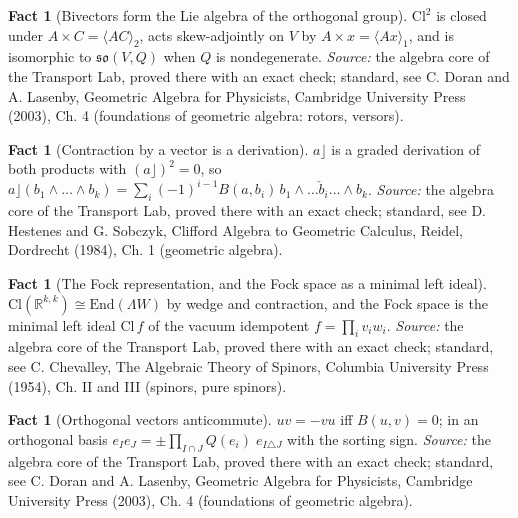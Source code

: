 \documentclass[11pt]{article}
\theoremstyle{definition}
\newtheorem{fact}[theorem]{Fact}
\theoremstyle{plain}
\providecommand{\Cl}{}\renewcommand{\Cl}{\mathrm{Cl}}
\providecommand{\End}{}\renewcommand{\End}{\mathrm{End}}
\providecommand{\R}{}\renewcommand{\R}{\mathbb{R}}
\providecommand{\so}{}\renewcommand{\so}{\mathfrak{so}}
\begin{document}
\begin{fact}[Bivectors form the Lie algebra of the orthogonal group]\label{c:std-algebra.bivector-lie-algebra}
$\Cl^{2}$ is closed under $A \times C = \langle AC \rangle_2$, acts skew-adjointly on $V$ by $A \times x = \langle Ax \rangle_1$, and is isomorphic to $\so(V,Q)$ when $Q$ is nondegenerate.
\emph{Source:} the algebra core of the Transport Lab, proved there with an exact check; standard, see C. Doran and A. Lasenby, Geometric Algebra for Physicists, Cambridge University Press (2003), Ch. 4 (foundations of geometric algebra: rotors, versors).
\end{fact}

\begin{fact}[Contraction by a vector is a derivation]\label{c:std-algebra.contraction-expansion}
$a \rfloor$ is a graded derivation of both products with $(a \rfloor)^{2} = 0$, so $a \rfloor (b_1 \wedge \dots \wedge b_k) = \sum_i (-1)^{i-1} B(a, b_i)\, b_1 \wedge \dots \check{b}_i \dots \wedge b_k$.
\emph{Source:} the algebra core of the Transport Lab, proved there with an exact check; standard, see D. Hestenes and G. Sobczyk, Clifford Algebra to Geometric Calculus, Reidel, Dordrecht (1984), Ch. 1 (geometric algebra).
\end{fact}

\begin{fact}[The Fock representation, and the Fock space as a minimal left ideal]\label{c:std-algebra.fock-representation}
$\Cl(\R^{k,k}) \cong \End(\Lambda W)$ by wedge and contraction, and the Fock space is the minimal left ideal $\Cl\, f$ of the vacuum idempotent $f = \prod_i v_i w_i$.
\emph{Source:} the algebra core of the Transport Lab, proved there with an exact check; standard, see C. Chevalley, The Algebraic Theory of Spinors, Columbia University Press (1954), Ch. II and III (spinors, pure spinors).
\end{fact}

\begin{fact}[Orthogonal vectors anticommute]\label{c:std-algebra.orthogonal-anticommute}
$uv = -vu$ iff $B(u,v) = 0$; in an orthogonal basis $e_I e_J = \pm \prod_{I \cap J} Q(e_i)\; e_{I \triangle J}$ with the sorting sign.
\emph{Source:} the algebra core of the Transport Lab, proved there with an exact check; standard, see C. Doran and A. Lasenby, Geometric Algebra for Physicists, Cambridge University Press (2003), Ch. 4 (foundations of geometric algebra).
\end{fact}
\end{document}
